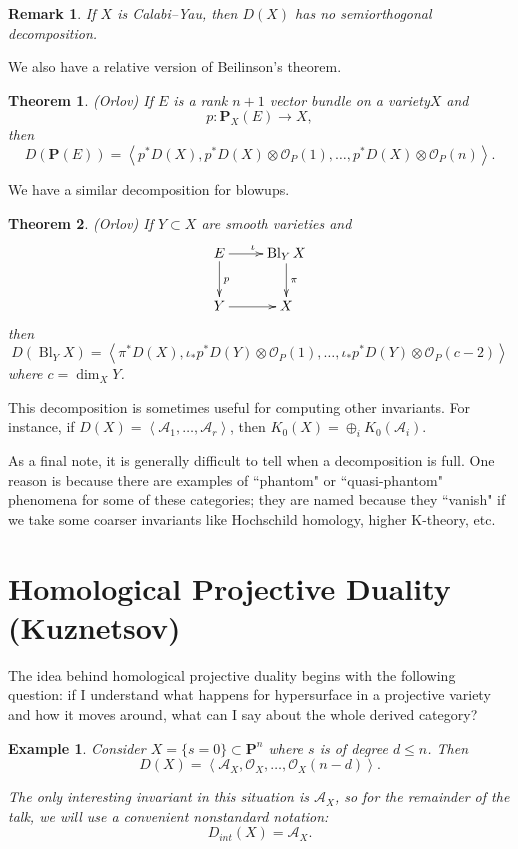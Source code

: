 \documentclass{amsart}
\newtheorem*{thm}{Theorem}
\newtheorem*{ex}{Example}
\newtheorem*{rem}{Remark}
\newcommand{\A}{\mathcal{A}}
\newcommand{\PP}{\textbf{P}}
\newcommand{\Oh}{\mathcal{O}}
\DeclareMathOperator{\Bl}{Bl}
\begin{document}
\begin{rem}
If $X$ is Calabi--Yau, then $D(X)$ has no semiorthogonal decomposition.
\end{rem}

We also have a relative version of Beilinson's theorem.

\begin{thm}(Orlov)
If $E$ is a rank $n+1$ vector bundle on a variety$X$ and
\[
p: \PP_X(E) \to X,
\]
then
\[
D(\PP(E)) = \left< p^* D(X), p^*D(X) \otimes \Oh_P(1), \ldots, p^*D(X) \otimes \Oh_P(n)\right>.
\]
\end{thm}

We have a similar decomposition for blowups.

\begin{thm}(Orlov)
If $Y \subset X$ are smooth varieties and
\[
\xymatrix{
E \ar[r]^\iota \ar[d]^p & \Bl_Y X \ar[d]^\pi \\
Y \ar[r] & X
}
\]
then
\[
D(\Bl_Y X) = \left<\pi^* D(X), \iota_*p^*D(Y) \otimes \Oh_P(1), \ldots, \iota_* p^*D(Y) \otimes \Oh_P(c-2)\right>
\]
where $c = \dim_X Y$.
\end{thm}

This decomposition is sometimes useful for computing other invariants. For instance, if $D(X) = \left<\A_1, \ldots, \A_r\right>$, then $K_0(X) = \oplus_i K_0(\A_i)$.

As a final note, it is generally difficult to tell when a decomposition is full. One reason is because there are examples of ``phantom" or ``quasi-phantom" phenomena for some of these categories; they are named because they ``vanish" if we take some coarser invariants like Hochschild homology, higher K-theory, etc.


\section{Homological Projective Duality (Kuznetsov)}

The idea behind homological projective duality begins with the following question: if I understand what happens for hypersurface in a projective variety and how it moves around, what can I say about the whole derived category?

\begin{ex}
Consider $X = \{s = 0\} \subset \PP^n$ where $s$ is of degree $d \leq n$. Then
\[
D(X) = \left<\A_X, \Oh_X, \ldots, \Oh_X(n-d)\right>.
\]

The only interesting invariant in this situation is $\A_X$, so for the remainder of the talk, we will use a convenient nonstandard notation:
\[
D_{int}(X) = \A_X.
\]
\end{ex}
\end{document}
